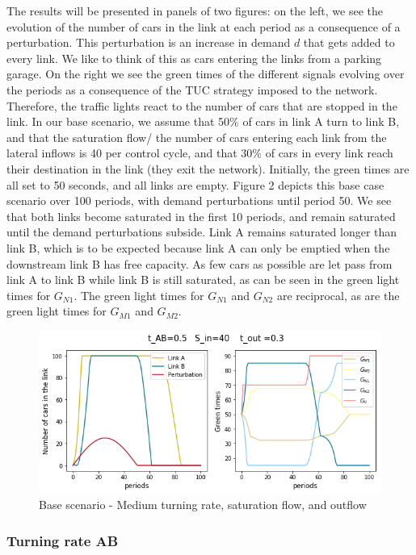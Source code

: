 \documentclass[11pt]{article}
\begin{document}
The results will be presented in panels of two figures: on the left, we see the evolution of the number of cars in the link at each period as a consequence of a perturbation. This perturbation is an increase in demand $d$ that gets added to every link. We like to think of this as cars entering the links from a parking garage. 
On the right we see the green times of the different signals evolving over the periods as a consequence of the TUC strategy imposed to the network. Therefore, the traffic lights react to the number of cars that are stopped in the link. In our base scenario, we assume that 50\% of cars in link A turn to link B, and that the saturation flow/ the number of cars entering each link from the lateral inflows is 40 per control cycle, and that 30\% of cars in every link reach their destination in the link (they exit the network). Initially, the green times are all set to 50 seconds, and all links are empty. Figure 2 depicts this base case scenario over 100 periods, with demand perturbations until period 50. We see that both links become saturated in the first 10 periods, and remain saturated until the demand perturbations subside. Link A remains saturated longer than link B, which is to be expected because link A can only be emptied when the downstream link B has free capacity. As few cars as possible are let pass from link A to link B while link B is still saturated, as can be seen in the green light times for $G_{N1}$. The green light times for  $G_{N1}$ and  $G_{N2}$ are reciprocal, as are the green light times for $G_{M1}$ and  $G_{M2}$. 

\begin{figure}[h!]
    \caption{Base scenario - Medium turning rate, saturation flow, and outflow}
      \centering
	\includegraphics[width=13cm]{sim4}
\end{figure}

\subsubsection{Turning rate AB}
\end{document}
